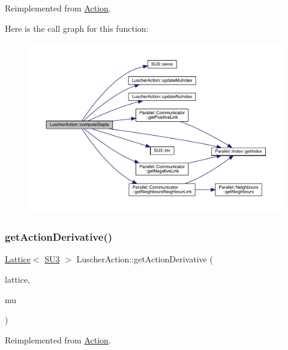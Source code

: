 Reimplemented from \mbox{\hyperlink{class_action_a2d5a64b47a8913955e5911ca072ff80d}{Action}}.

Here is the call graph for this function\+:\nopagebreak
\begin{figure}[H]
\begin{center}
\leavevmode
\includegraphics[width=350pt]{class_luscher_action_a42285b6e3015935588e1fab6b90c1a11_cgraph}
\end{center}
\end{figure}
\mbox{\label{class_luscher_action_ac11785b2df276816a098a87e6ac514c7}} 
\subsubsection{\texorpdfstring{getActionDerivative()}{getActionDerivative()}}
{\footnotesize\ttfamily \mbox{\hyperlink{class_lattice}{Lattice}}$<$ \mbox{\hyperlink{class_s_u3}{S\+U3}} $>$ Luscher\+Action\+::get\+Action\+Derivative (\begin{DoxyParamCaption}\item[{\mbox{\hyperlink{class_lattice}{Lattice}}$<$ \mbox{\hyperlink{class_s_u3}{S\+U3}} $>$ $\ast$}]{lattice,  }\item[{int}]{mu }\end{DoxyParamCaption})\hspace{0.3cm}{\ttfamily [virtual]}}



Reimplemented from \mbox{\hyperlink{class_action_a78168dd7c3819a3365e28fc1aae1b9b6}{Action}}.

